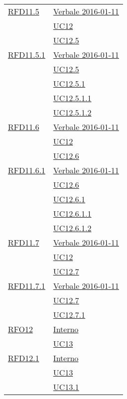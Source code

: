 \begin{longtable}{|>{\centering}m{5cm}|m{5cm}<{\centering}|}
\hyperlink{RFD11.5}{RFD11.5} & \hyperlink{Verbale 2016-01-11}{Verbale 2016-01-11}\\
& \hyperref[UC12]{UC12}\\
& \hyperref[UC12.5]{UC12.5}\\ \hline

\hyperlink{RFD11.5.1}{RFD11.5.1} & \hyperlink{Verbale 2016-01-11}{Verbale 2016-01-11}\\
& \hyperref[UC12.5]{UC12.5}\\
& \hyperref[UC12.5.1]{UC12.5.1}\\
& \hyperref[UC12.5.1.1]{UC12.5.1.1}\\
& \hyperref[UC12.5.1.2]{UC12.5.1.2}\\ \hline

\hyperlink{RFD11.6}{RFD11.6} & \hyperlink{Verbale 2016-01-11}{Verbale 2016-01-11}\\
& \hyperref[UC12]{UC12}\\
& \hyperref[UC12.6]{UC12.6}\\ \hline

\hyperlink{RFD11.6.1}{RFD11.6.1} & \hyperlink{Verbale 2016-01-11}{Verbale 2016-01-11}\\
& \hyperref[UC12.6]{UC12.6}\\
& \hyperref[UC12.6.1]{UC12.6.1}\\
& \hyperref[UC12.6.1.1]{UC12.6.1.1}\\
& \hyperref[UC12.6.1.2]{UC12.6.1.2}\\ \hline

\hyperlink{RFD11.7}{RFD11.7} & \hyperlink{Verbale 2016-01-11}{Verbale 2016-01-11}\\
& \hyperref[UC12]{UC12}\\
& \hyperref[UC12.7]{UC12.7}\\ \hline

\hyperlink{RFD11.7.1}{RFD11.7.1} & \hyperlink{Verbale 2016-01-11}{Verbale 2016-01-11}\\
& \hyperref[UC12.7]{UC12.7}\\
& \hyperref[UC12.7.1]{UC12.7.1}\\ \hline

\hyperlink{RFO12}{RFO12} & \hyperlink{Interno}{Interno}\\
& \hyperref[UC13]{UC13}\\ \hline

\hyperlink{RFD12.1}{RFD12.1} & \hyperlink{Interno}{Interno}\\
& \hyperref[UC13]{UC13}\\
& \hyperref[UC13.1]{UC13.1}\\ \hline


\end{longtable}
